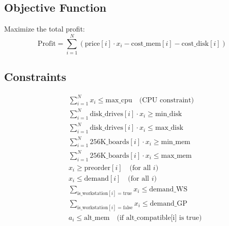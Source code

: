 \documentclass{article}
\begin{document}
\subsection*{Objective Function}
Maximize the total profit:
\[
\text{Profit} = \sum_{i=1}^{N} \left( \text{price}[i] \cdot x_i - \text{cost\_mem}[i] - \text{cost\_disk}[i] \right)
\]

\subsection*{Constraints}
\begin{align}
    & \sum_{i=1}^{N} x_i \leq \text{max\_cpu} \quad \text{(CPU constraint)} \\
    & \sum_{i=1}^{N} \text{disk\_drives}[i] \cdot x_i \geq \text{min\_disk} \\
    & \sum_{i=1}^{N} \text{disk\_drives}[i] \cdot x_i \leq \text{max\_disk} \\
    & \sum_{i=1}^{N} \text{256K\_boards}[i] \cdot x_i \geq \text{min\_mem} \\
    & \sum_{i=1}^{N} \text{256K\_boards}[i] \cdot x_i \leq \text{max\_mem} \\
    & x_i \geq \text{preorder}[i] \quad \text{(for all } i\text{)} \\
    & x_i \leq \text{demand}[i] \quad \text{(for all } i\text{)} \\
    & \sum_{\text{is\_workstation}[i] = \text{true}} x_i \leq \text{demand\_WS} \\
    & \sum_{\text{is\_workstation}[i] = \text{false}} x_i \leq \text{demand\_GP} \\
    & a_i \leq \text{alt\_mem} \quad \text{(if alt\_compatible[i] is true)} 
\end{align}
\end{document}
